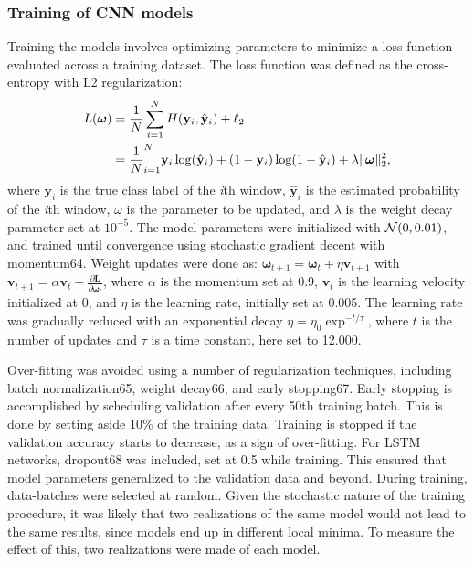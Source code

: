\subsubsection{Training of CNN models}
Training the models involves optimizing parameters to minimize a loss function evaluated across a training dataset. The loss function was defined as the cross-entropy with L2 regularization:
\begin{align}
\begin{split}
    L(\boldsymbol{\omega}) &= \frac{1}{N}\sum_{i=1}^{N} H \! \left( \mathbf{y}_i, \hat{\mathbf{y}}_i \right) + \ell_2 \\
    &= \frac{1}{N}_{i=1}^{N} \mathbf{y}_i \log \! \left( \hat{\mathbf{y}}_i \right) + \left( 1 - \mathbf{y}_i \right) \log \! \left( 1 - \hat{\mathbf{y}}_i \right) + \lambda \| \boldsymbol{\omega} \|^2_2,
\end{split}
\end{align}
where $\mathbf{y}_i$ is the true class label of the \textit{i}th window, $\hat{\mathbf{y}}_i$ is the estimated probability of the \textit{i}th window, $\omega$ is the parameter to be updated, and $\lambda$ is the weight decay parameter set at $10^{-5}$. The model parameters were initialized with $\mathcal{N} \! \left( 0, 0.01 \right)$, and trained until convergence using stochastic gradient decent with momentum64. Weight updates were done as: $\boldsymbol{\omega}_{t+1} = \boldsymbol{\omega}_t + \eta \mathbf{v}_{t+1}$ with $\mathbf{v}_{t+1} = \alpha \mathbf{v}_t - \frac{\partial \mathbf{L}}{\partial \boldsymbol{\omega}_t}$, where $\alpha$ is the momentum set at 0.9, $\mathbf{v}_t$ is the learning velocity initialized at 0, and $\eta$ is the learning rate, initially set at 0.005. The learning rate was gradually reduced with an exponential decay $\eta = \eta_0 \exp^{-t/\tau}$, where $t$ is the number of updates and $\tau$ is a time constant, here set to 12.000.

Over-fitting was avoided using a number of regularization techniques, including batch normalization65, weight decay66, and early stopping67. Early stopping is accomplished by scheduling validation after every 50th training batch. This is done by setting aside 10\% of the training data. Training is stopped if the validation accuracy starts to decrease, as a sign of over-fitting. For LSTM networks, dropout68 was included, set at 0.5 while training. This ensured that model parameters generalized to the validation data and beyond. During training, data-batches were selected at random. Given the stochastic nature of the training procedure, it was likely that two realizations of the same model would not lead to the same results, since models end up in different local minima. To measure the effect of this, two realizations were made of each model.

